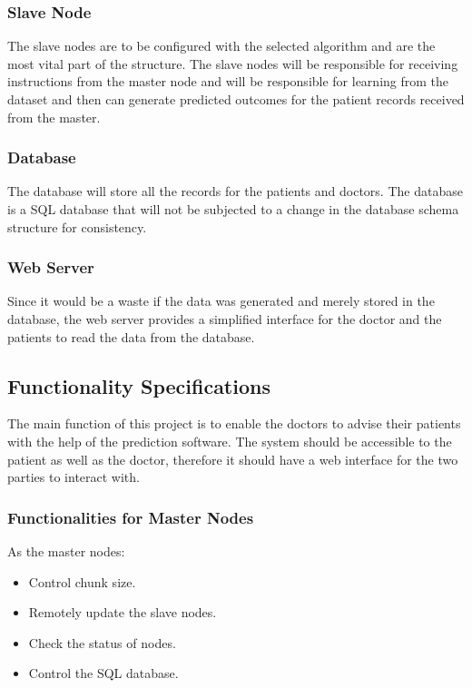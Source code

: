 \documentclass[12pt]{article}
\begin{document}
\subsubsection{Slave Node}
The slave nodes are to be configured with the selected algorithm and are the most vital part of the structure. The slave nodes will be responsible for receiving instructions from the master node and will be responsible for learning from the dataset and then can generate predicted outcomes for the patient records received from the master. 

\subsubsection{Database}
The database will store all the records for the patients and doctors. The database is a SQL database that will not be subjected to a change in the database schema structure for consistency.

\subsubsection{Web Server}
Since it would be a waste if the data was generated and merely stored in the database, the web server provides a simplified interface for the doctor and the patients to read the data from the database.

\clearpage
\newpage
\subsection{Functionality Specifications}
The main function of this project is to enable the doctors to advise their patients with the help of the prediction software. The system should be accessible to the patient as well as the doctor, therefore it should have a web interface for the two parties to interact with.

\subsubsection{Functionalities for Master Nodes}
As the master nodes:
\begin{itemize}
\item Control chunk size.
\item Remotely update the slave nodes.
\item Check the status of nodes.
\item Control the SQL database.
\end{itemize}
\end{document}
